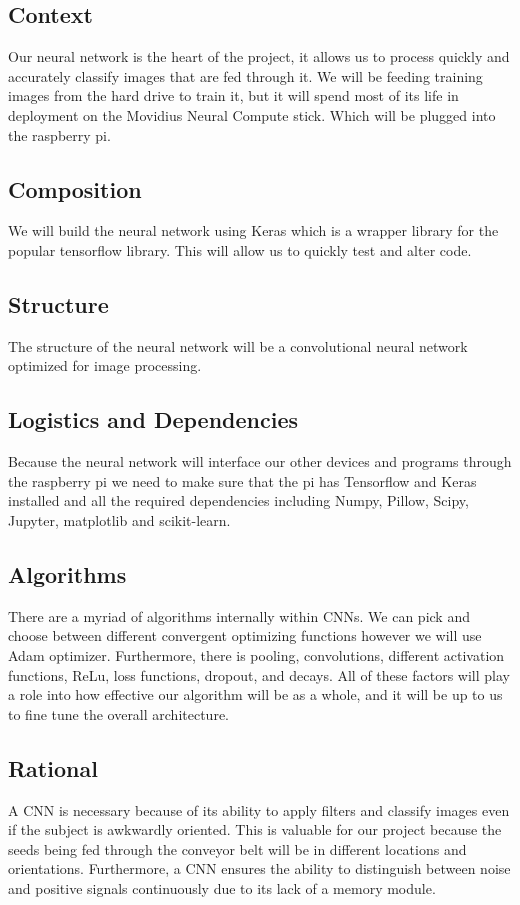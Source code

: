 \subsection{Context} Our neural network is the heart of the project, it allows us to process quickly and accurately classify images that are fed through it. We will be feeding training images from the hard drive to train it, but it will spend most of its life in deployment on the Movidius Neural Compute stick. Which will be plugged into the raspberry pi.
 \subsection{Composition} We will build the neural network using Keras which is a wrapper library for the popular tensorflow library. This will allow us to quickly test and alter code. 
\subsection{Structure} The structure of the neural network will be a convolutional neural network optimized for image processing. 
\subsection{Logistics and Dependencies} Because the neural network will interface our other devices and programs through the raspberry pi we need to make sure that the pi has Tensorflow and Keras installed and all the required dependencies including Numpy, Pillow, Scipy, Jupyter, matplotlib and scikit-learn. 
\subsection{Algorithms} There are a myriad of algorithms internally within CNNs. We can pick and choose between different convergent optimizing functions however we will use Adam optimizer. Furthermore, there is pooling, convolutions, different activation functions, ReLu, loss functions, dropout, and decays. All of these factors will play a role into how effective our algorithm will be as a whole, and it will be up to us to fine tune the overall architecture. 
\subsection{Rational} A CNN is necessary because of its ability to apply filters and classify images even if the subject is awkwardly oriented. This is valuable for our project because the seeds being fed through the conveyor belt will be in different locations and orientations. Furthermore, a CNN ensures the ability to distinguish between noise and positive signals continuously due to its lack of a memory module. 
